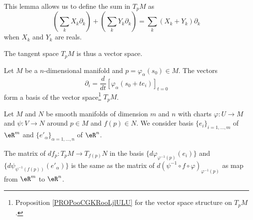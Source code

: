 \begin{proposition}		\label{PROPooCGKRooLjlULU}
	This lemma allows us to define the sum in \( T_pM\) as      %
	\begin{equation}
		\left( \sum_kX_k\partial_k \right)+\left( \sum_kY_k\partial_k \right)=\sum_k (X_k+Y_k)\partial_k
	\end{equation}
	when \( X_k\) and \( Y_k\) are reals.

	The tangent space \( T_pM\) is thus a vector space.
\end{proposition}

\begin{proposition}		\label{PROPooAAAXooKAMsfK}
	Let \( M\) be a \( n\)-dimensional manifold and \( p=\varphi_{\alpha}(s_0)\in M\). The vectors
	\begin{equation}
		\partial_i=\frac{d}{dt} \left[ \varphi_{\alpha}(s_0+te_i)  \right]_{t=0}
	\end{equation}
	form a basis of the vector space\footnote{Proposition \ref{PROPooCGKRooLjlULU} for the vector space structure on \( T_pM\).} \( T_pM\).
\end{proposition}


\begin{lemma}       \label{LEMooVCSJooEuDZFz}
	Let \( M\) and \( N\) be smooth manifolds of dimension \( m\) and \( n\) with charts \( \varphi\colon U\to M\) and \( \psi\colon V\to N\) around \( p\in M\) and \( f(p)\in N\). We consider basis \( \{ e_i \}_{i=1,\ldots, m}\) of \( \eR^m\) and \( \{ e'_{\alpha} \}_{\alpha=1,\ldots, n}\) of \( \eR^n\).

	The matrix of \( df_p\colon T_pM\to T_{f(p)}N\) in the basis \( \{ d\varphi_{\varphi^{-1}(p)}(e_i) \}\) and \( \{ d\psi_{\psi^{-1}(f(p))}(e'_{\alpha}) \}\) is the same as the matrix of \( d(\psi^{-1}\circ f\circ\varphi)_{\varphi^{-1}(p)}\) as map from \( \eR^m\) to \( \eR^n\).
\end{lemma}


